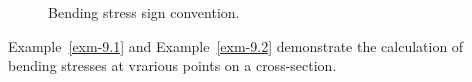 \documentclass[
  letterpaper,
  DIV=11,
  numbers=noendperiod]{scrreprt}
\theoremstyle{definition}
\theoremstyle{remark}
\begin{document}
\begin{figure}


\caption{\label{fig-9.8}Bending stress sign convention.}

\end{figure}%

Example~\ref{exm-9.1} and Example~\ref{exm-9.2} demonstrate the
calculation of bending stresses at vrarious points on a cross-section.
\end{document}

